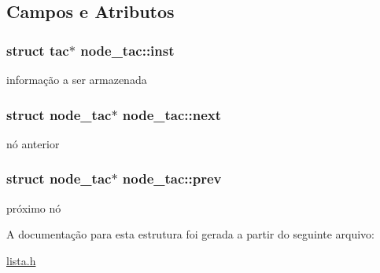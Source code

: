 \subsection{Campos e Atributos}
\hypertarget{structnode__tac_a30e49a29ec5242fba75f64e739cd8539}{
\subsubsection[{inst}]{\setlength{\rightskip}{0pt plus 5cm}struct {\bf tac}$\ast$ {\bf node\_\-tac::inst}}}
\label{structnode__tac_a30e49a29ec5242fba75f64e739cd8539}
informação a ser armazenada \hypertarget{structnode__tac_aa67e7998f0070fc240f79534788b7587}{
\subsubsection[{next}]{\setlength{\rightskip}{0pt plus 5cm}struct {\bf node\_\-tac}$\ast$ {\bf node\_\-tac::next}}}
\label{structnode__tac_aa67e7998f0070fc240f79534788b7587}
nó anterior \hypertarget{structnode__tac_a7ffb36df18c662a79e17e0c01d630aff}{
\subsubsection[{prev}]{\setlength{\rightskip}{0pt plus 5cm}struct {\bf node\_\-tac}$\ast$ {\bf node\_\-tac::prev}}}
\label{structnode__tac_a7ffb36df18c662a79e17e0c01d630aff}
próximo nó 

A documentação para esta estrutura foi gerada a partir do seguinte arquivo:\begin{DoxyCompactItemize}
\item 
\hyperlink{lista_8h}{lista.h}\end{DoxyCompactItemize}
